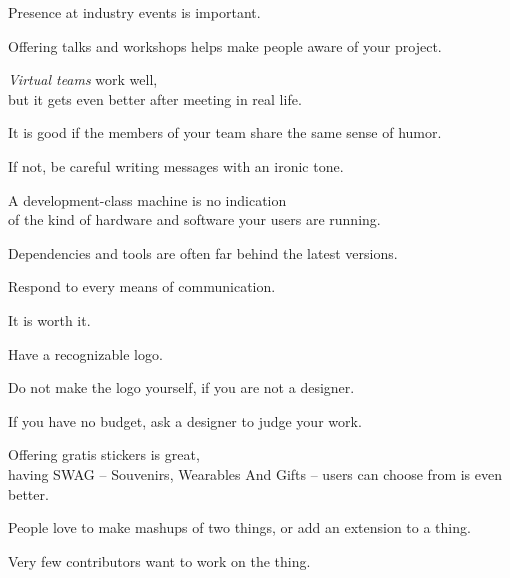 \documentclass[t,aspectratio=169]{beamer}
\begin{document}
\begin{frame}[fragile]%
    \vfill
    Presence at industry events is important. \pause

    Offering talks and workshops helps make people aware of your project.
\end{frame}

\begin{frame}[fragile]%
    \vfill
    \textit{Virtual teams} work well, \pause \\
    but it gets even better after meeting in real life.
\end{frame}

\begin{frame}[fragile]%
    \vfill
    It is good if the members of your team share the same sense of humor. \pause

    If not, be careful writing messages with an ironic tone.
\end{frame}

\begin{frame}[fragile]%
    \vfill
    A development-class machine is no indication \\
    of the kind of hardware and software your users are running. \pause

    Dependencies and tools are often far behind the latest versions.
\end{frame}

\begin{frame}[fragile]%
    \vfill
    Respond to every means of communication.

    It is worth it.
\end{frame}

\begin{frame}[fragile]%
    \vfill
    Have a recognizable logo. \pause

    Do not make the logo yourself, if you are not a designer. \pause

    If you have no budget, ask a designer to judge your work.
\end{frame}

\begin{frame}[fragile]%
    \vfill
    Offering gratis stickers is great, \pause \\
    having SWAG -- Souvenirs, Wearables And Gifts -- users can choose from is even better.
\end{frame}

\begin{frame}[fragile]%
    \vfill
    People love to make mashups of two things, or add an extension to a thing. \pause

    Very few contributors want to work on the thing.
\end{frame}
\end{document}
